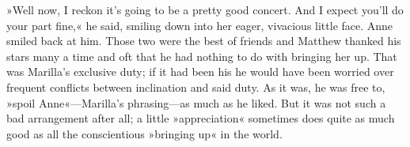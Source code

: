 »Well now, I reckon it’s going to be a pretty good concert. And I expect you’ll do your part fine,« he said, smiling down into her eager, vivacious little face. Anne smiled back at him. Those two were the best of friends and Matthew thanked his stars many a time and oft that he had nothing to do with bringing her up. That was Marilla’s exclusive duty; if it had been his he would have been worried over frequent conflicts between inclination and said duty. As it was, he was free to, »spoil Anne«—Marilla’s phrasing—as much as he liked. But it was not such a bad arrangement after all; a little »appreciation« sometimes does quite as much good as all the conscientious »bringing up« in the world.